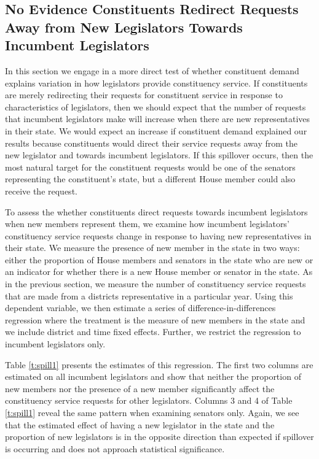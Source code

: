 \documentclass[12pt]{article}
\begin{document}
\subsection{No Evidence Constituents Redirect Requests Away from New Legislators Towards Incumbent Legislators}
In this section we engage in a more direct test of whether constituent demand explains variation in how legislators provide constituency service.  If constituents are merely redirecting their requests for constituent service in response to characteristics of legislators, then we should expect that the number of requests that incumbent legislators make will increase when there are new representatives in their state.  We would expect an increase if constituent demand explained our results because constituents would direct their service requests away from the new legislator and towards incumbent legislators.  If this spillover occurs, then the most natural target for the constituent requests would be one of the senators representing the constituent's state, but a different House member could also receive the request.    

To assess the whether constituents direct requests towards incumbent legislators when new members represent them, we examine how incumbent legislators' constituency service requests change in response to having new representatives in their state.  We measure the presence of new member in the state in two ways: either the proportion of House members and senators in the state who are new or an indicator for whether there is a new House member or senator in the state.  As in the previous section, we measure the number of constituency service requests that are made from a districts representative in a particular year.  Using this dependent variable, we then estimate a series of difference-in-differences regression where the treatment is the measure of new members in the state and we include district and time fixed effects.  Further, we restrict the regression to incumbent legislators only.    

Table \ref{t:spill1} presents the estimates of this regression.  The first two columns are estimated on all incumbent legislators and show that neither the proportion of new members nor the presence of a new member significantly affect the constituency service requests for other legislators. Columns 3 and 4 of Table \ref{t:spill1} reveal the same pattern when examining senators only.  Again, we see that the estimated effect of having a new legislator in the state and the proportion of new legislators is in the opposite direction than expected if spillover is occurring and does not approach statistical significance.  
\end{document}
